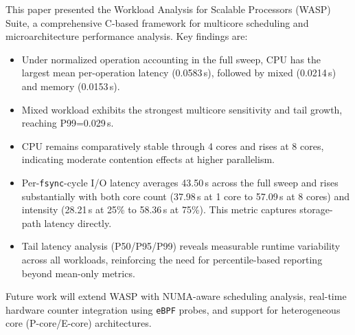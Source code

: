 \documentclass[conference]{IEEEtran}
\begin{document}
This paper presented the Workload Analysis for Scalable Processors (WASP)
Suite, a
comprehensive C-based framework for multicore scheduling and microarchitecture
performance analysis.  Key findings are:

\begin{itemize}
  \item Under normalized operation accounting in the full sweep, CPU has the
        largest mean per-operation latency (0.0583\,\textmu{}s), followed by
        mixed (0.0214\,\textmu{}s) and memory (0.0153\,\textmu{}s).
  \item Mixed workload exhibits the strongest multicore sensitivity and tail
        growth, reaching P99=0.029\,\textmu{}s.
  \item CPU remains comparatively stable through 4 cores and rises at 8 cores,
        indicating moderate contention effects at higher parallelism.
  \item Per-\texttt{fsync}-cycle I/O latency averages 43.50\,\textmu{}s across
        the full sweep and rises substantially with both core count
        (37.98\,\textmu{}s at 1 core to 57.09\,\textmu{}s at 8 cores) and
        intensity (28.21\,\textmu{}s at 25\% to 58.36\,\textmu{}s at 75\%).
        This metric captures storage-path latency directly.
  \item Tail latency analysis (P50/P95/P99) reveals measurable runtime
        variability across all workloads, reinforcing the need for
        percentile-based reporting beyond mean-only metrics.
\end{itemize}

Future work will extend WASP with NUMA-aware scheduling analysis, real-time
hardware counter integration using \texttt{eBPF} probes, and support for
heterogeneous core (P-core/E-core) architectures.
\end{document}
